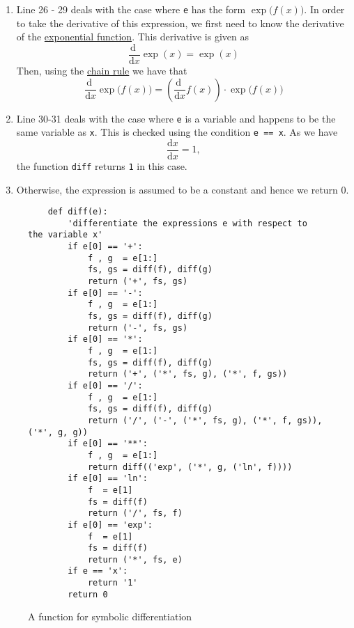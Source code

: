 \begin{enumerate}
\item Line 26 - 29 deals with the case where \texttt{e} has the form $\exp\bigl(f(x)\bigr)$.  
      In order to take the derivative of this expression, we first need to know the derivative of the 
      \href{https://en.wikipedia.org/wiki/Exponential\_function}{exponential function}.  
      This derivative is given as 
      $$ \frac{\mathrm{d}\;}{\mathrm{d}x} \exp(x) = \exp(x)$$    
      Then, using the \href{https://en.wikipedia.org/wiki/Chain\_rule}{chain rule} we have that
      $$\frac{\mathrm{d}\;}{\mathrm{d}x} \exp\bigl(f(x)\bigr) = \left(\frac{\mathrm{d}\;}{\mathrm{d}x} f(x)\right) \cdot \exp\bigl(f(x)\bigr) $$
\item Line 30-31 deals with the case where \texttt{e} is a variable and happens to be the same variable as
      \texttt{x}.  This is checked using the condition    
      \texttt{e == x}.  As we have
      $$\frac{\mathrm{d}x}{\mathrm{d}x} = 1,$$
      the function \texttt{diff} returns \texttt{1} in this case.  
\item Otherwise, the expression is assumed to be a constant and hence we return 0.
\end{enumerate}


\begin{figure}[!ht]
\centering
\begin{verbatim}
    def diff(e):
        'differentiate the expressions e with respect to the variable x'
        if e[0] == '+':
            f , g  = e[1:]
            fs, gs = diff(f), diff(g)
            return ('+', fs, gs)
        if e[0] == '-':
            f , g  = e[1:]
            fs, gs = diff(f), diff(g)
            return ('-', fs, gs)
        if e[0] == '*':
            f , g  = e[1:]
            fs, gs = diff(f), diff(g)
            return ('+', ('*', fs, g), ('*', f, gs))
        if e[0] == '/':
            f , g  = e[1:]
            fs, gs = diff(f), diff(g)
            return ('/', ('-', ('*', fs, g), ('*', f, gs)), ('*', g, g))
        if e[0] == '**':
            f , g  = e[1:]
            return diff(('exp', ('*', g, ('ln', f))))
        if e[0] == 'ln':
            f  = e[1]
            fs = diff(f) 
            return ('/', fs, f)
        if e[0] == 'exp':
            f  = e[1]
            fs = diff(f) 
            return ('*', fs, e)
        if e == 'x':
            return '1'
        return 0                  
\end{verbatim}
\vspace*{-0.3cm}
\caption{A function for symbolic differentiation}
\label{fig:diff.py}
\end{figure}



